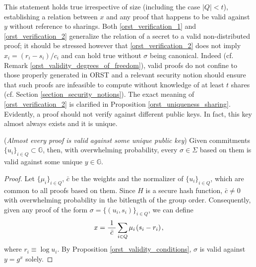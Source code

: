 \documentclass{iacrtrans}
\begin{document}
\noindent
This statement holds true irrespective of size
(including the case $|Q| < t$),
establishing a relation between $x$ and any proof
that happens to be valid against $y$
without reference to sharings.
Both \eqref{orst_verification_1} and \eqref{orst_verification_2}
generalize the relation of a secret to a
valid non-distributed proof;
it should be stressed however that
\eqref{orst_verification_2} does not imply
$x_i = (r_i - s_i)/c_i$ and
can hold true without $\sigma$ being canonical.
Indeed (cf. Remark \ref{orst_validity_degrees_of_freedom}),
valid proofs do not confine to those properly
generated in \textsf{ORST} and a relevant security notion
should ensure that such proofs are infeasible to compute
without knowledge of at least $t$ shares
(cf. Section \ref{section_security_notions}).
The exact meaning of \eqref{orst_verification_2}
is clarified in Proposition \ref{orst_uniqueness_sharing}.
Evidently, a proof should not verify against
different public keys.
In fact, this key almost always exists and it is unique.

\begin{prop}\label{orst_uniqueness_public_key}
\textup{(\textit{Almost every proof is valid against
some unique public key})}
Given commitments $\{u_i\}_{i \in Q} \subset \mathbb{G}$,
then, with overwhelming probability,
every $\sigma \in \Sigma$ based on them
is valid against some unique $y \in \mathbb{G}$.
\end{prop}

\begin{proof}
Let $\{\mu_i\}_{i \in Q}$, $\bar{c}$
be the weights and the normalizer of $\{u_i\}_{i \in Q}$,
which are common to all proofs based on them.
Since $H$ is a secure hash function,
$\bar{c} \neq 0$ with overwhelming probability in
the bitlength of the group order.
Consequently, given any proof of the form
$\sigma = \{(u_i, s_i)\}_{i \in Q}$, we can define
\vspace{5pt}
\begin{equation*}
x = \frac{1}{\ \bar{c}\ }
\sum_{i \in Q} \mu_i\hspace{1pt}(s_i - r_i)\hspace{1pt},
\vspace{5pt}
\end{equation*}
where $r_i \equiv \log u_i$.
By Proposition \ref{orst_validity_conditions},
$\sigma$ is valid against $y = g ^ x$ solely.
\vspace{5pt}
\end{proof}
\end{document}
